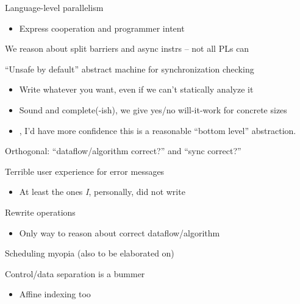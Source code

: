 \newpage
{}

{\LARGE

Language-level parallelism

\begin{itemize}
  \item Express cooperation and programmer intent
\end{itemize}

\vfill

We reason about split barriers and async instrs -- not all PLs can

\vfill

``Unsafe by default'' abstract machine for synchronization checking

\begin{itemize}
  \item Write whatever you want, even if we can't statically analyze it
  \item Sound and complete(-ish), we give yes/no will-it-work for concrete sizes
  \item {}, I'd have more confidence this is a reasonable ``bottom level'' abstraction.
\end{itemize}

\vfill

Orthogonal: ``dataflow/algorithm correct?'' and ``sync correct?''

}

\newpage
{}

{\LARGE



Terrible user experience for error messages
\begin{itemize}
  \item At least the ones \emph{\textrm{I}}, personally, did not write
\end{itemize}

\vfill

Rewrite operations 
\begin{itemize}
  \item Only way to reason about correct dataflow/algorithm
\end{itemize}

\vfill

Scheduling myopia (also to be elaborated on)

\vfill

Control/data separation is a bummer
\begin{itemize}
  \item Affine indexing too
\end{itemize}

\vfill

}

